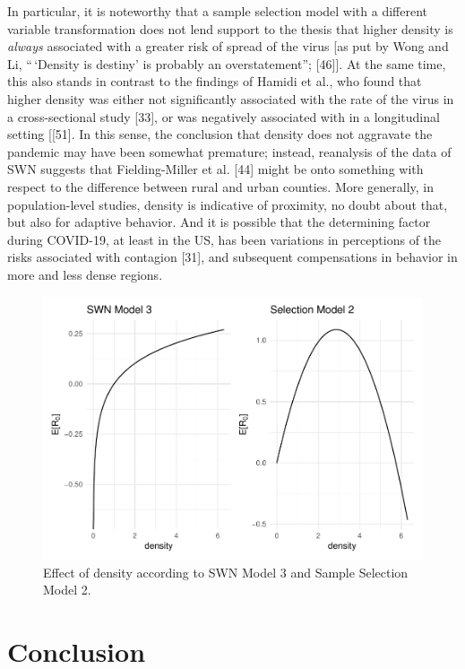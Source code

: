 \documentclass[10pt,letterpaper]{article}
\begin{document}
In particular, it is noteworthy that a sample selection model with a
different variable transformation does not lend support to the thesis
that higher density is \emph{always} associated with a greater risk of
spread of the virus {[}as put by Wong and Li, ``\,`Density is destiny'
is probably an overstatement''; {[}46{]}{]}. At the same time, this also
stands in contrast to the findings of Hamidi et al., who found that
higher density was either not significantly associated with the rate of
the virus in a cross-sectional study {[}33{]}, or was negatively
associated with in a longitudinal setting {[}{[}51{]}. In this sense,
the conclusion that density does not aggravate the pandemic may have
been somewhat premature; instead, reanalysis of the data of SWN suggests
that Fielding-Miller et al. {[}44{]} might be onto something with
respect to the difference between rural and urban counties. More
generally, in population-level studies, density is indicative of
proximity, no doubt about that, but also for adaptive behavior. And it
is possible that the determining factor during COVID-19, at least in the
US, has been variations in perceptions of the risks associated with
contagion {[}31{]}, and subsequent compensations in behavior in more and
less dense regions.

\begin{figure}
\includegraphics[width=1\linewidth]{R0-Density-Reanalysis_files/figure-latex/comparison-results-1} \caption{\label{fig:comparison-results}Effect of density according to SWN Model 3 and Sample Selection Model 2.}\label{fig:comparison-results}
\end{figure}

\hypertarget{conclusion}{%
\section{Conclusion}\label{conclusion}}
\end{document}
